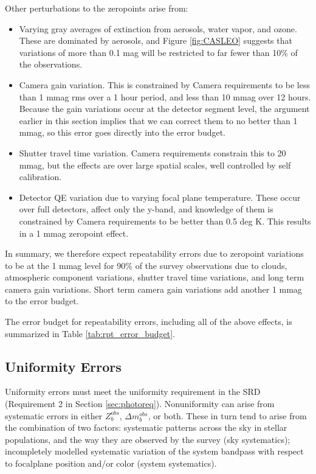 \documentclass[12pt,preprint]{aastex}
\begin{document}
Other perturbations to the zeropoints arise from:
\begin{itemize}
\item{Varying gray averages of extinction from aerosols, water vapor, and ozone.  These are dominated by aerosols, 
and Figure \ref{fig:CASLEO} suggests that variations of more than 0.1 mag will be restricted to far fewer than 
10\% of the observations.}
\item{Camera gain variation.  This is constrained by Camera requirements to be less than 1 mmag rms over a 1 hour
period, and less than 10 mmag over 12 hours.  Because the gain variations occur at the detector segment level, the
argument earlier in this section implies that we can correct them to no better than 1 mmag, so this error goes
directly into the error budget.}
\item{Shutter travel time variation.  Camera requirements constrain this to 20 mmag, but the effects are over
large spatial scales, well controlled by self calibration.}
\item{Detector QE variation due to varying focal plane temperature. These occur over full detectors,
affect only the y-band, and knowledge of them is constrained by Camera requirements to be better than 0.5 deg K.
This results in a 1 mmag zeropoint effect. }
\end{itemize}

In summary, we therefore expect repeatability errors due to zeropoint variations to be at the 1 mmag level for 90\% of the 
survey observations due to clouds, atmospheric component variations, shutter travel time variations, and long term 
camera gain variations.  Short term camera gain variations add another 1 mmag to the error budget.

The error budget for repeatability errors, including all of the above effects, is summarized in Table \ref{tab:rpt_error_budget}.

\subsection{Uniformity Errors}
Uniformity errors must meet the uniformity requirement in the SRD (Requirement 2 in Section \ref{sec:photoreq}).  Nonuniformity 
can arise from systematic errors in either $Z_b^{obs}$, $\Delta m_b^{obs}$, or both.  
These in turn tend to arise from the combination of two factors: systematic patterns across the sky in stellar populations, 
and the way they are observed by the survey (sky systematics);  
incompletely modelled systematic
variation of the system bandpass with respect to focalplane position and/or color (system systematics).
\end{document}

